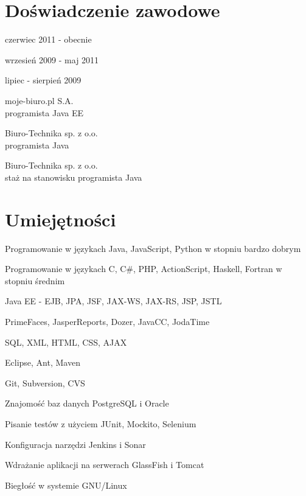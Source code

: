 \documentclass[letterpaper]{article}
\renewenvironment{itemize}{
  \begin{list}{}{
    \setlength{\leftmargin}{1.5em}
  }
}{
  \end{list}
}
\begin{document}
\section*{Doświadczenie zawodowe}

\begin{minipage}{0.30\linewidth}
  \begin{itemize}
    \item czerwiec 2011 - obecnie\\
    \item wrzesień 2009 - maj 2011\\
    \item lipiec - sierpień 2009\\
  \end{itemize}
\end{minipage}
\begin{minipage}{0.70\linewidth}
  \begin{itemize}
    \item moje-biuro.pl S.A.\\
      programista Java EE
    \item Biuro-Technika sp. z o.o.\\
      programista Java
    \item Biuro-Technika sp. z o.o.\\
      staż na stanowisku programista Java
  \end{itemize}
\end{minipage}


\section*{Umiejętności}

\begin{itemize}
\item Programowanie w językach Java, JavaScript, Python w stopniu bardzo dobrym
\item Programowanie w językach C, C\#, PHP, ActionScript, Haskell, Fortran w stopniu średnim
\item Java EE - EJB, JPA, JSF, JAX-WS, JAX-RS, JSP, JSTL
\item PrimeFaces, JasperReports, Dozer, JavaCC, JodaTime
\item SQL, XML, HTML, CSS, AJAX
\item Eclipse, Ant, Maven
\item Git, Subversion, CVS
\item Znajomość baz danych PostgreSQL i Oracle
\item Pisanie testów z użyciem JUnit, Mockito, Selenium
\item Konfiguracja narzędzi Jenkins i Sonar
\item Wdrażanie aplikacji na serwerach GlassFish i Tomcat
\item Biegłość w systemie GNU/Linux
\end{itemize}
\end{document}

